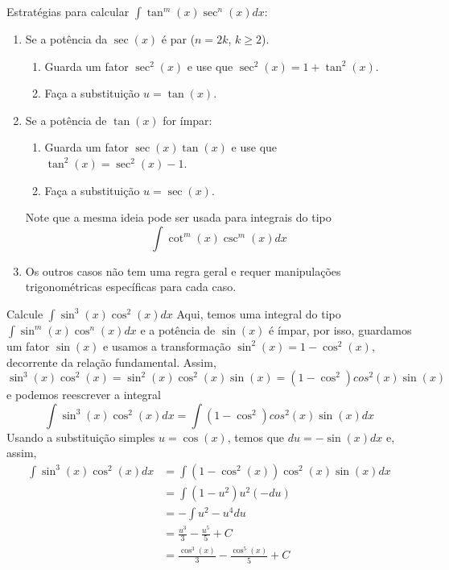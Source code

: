 Estratégias para calcular \(\int \tan^m(x) \sec^n(x)dx\):
\begin{enumerate}
  \item Se a potência da $\sec(x)$ é par ($n=2k$, $k \geq 2$).
        \begin{enumerate}
          \item Guarda um fator $\sec^2(x)$ e use que $\sec^2(x)=1+\tan^2(x)$.
          \item Faça a substituição $u=\tan(x)$.
        \end{enumerate}

  \item Se a potência de $\tan(x)$ for ímpar:
        \begin{enumerate}
          \item Guarda um fator $\sec(x)\tan(x)$ e use que $\tan^2(x)=\sec^2(x)-1$.
          \item Faça a substituição $u=\sec(x)$.
        \end{enumerate}
        Note que a mesma ideia pode ser usada para integrais do tipo
        \[
          \int \cot^m(x) \csc^m(x)dx
        \]

  \item Os outros casos não tem uma regra geral e requer manipulações
        trigonométricas específicas para cada caso.
\end{enumerate}

\begin{example}
  Calcule \(\int \sin^3(x)\cos^2(x)dx\)
  \solution
  Aqui, temos uma integral do tipo
  \(\int \sin^m(x) \cos^n(x)dx\)
  e a potência de $\sin(x)$ é ímpar,
  por isso, guardamos um fator $\sin(x)$ e usamos a transformação
  $\sin^2(x)= 1- \cos^2(x)$,
  decorrente da relação fundamental. Assim,
  \[
    \sin^3(x)\cos^2(x)= \sin^2(x)\cos^2(x)\sin(x)= (1-\cos^2)cos^2(x)\sin(x)
  \]
  e podemos reescrever a integral
  \[
    \int \sin^3(x)\cos^2(x)dx
    = \int \left(1-\cos^2\right)cos^2(x)\sin(x) dx
  \]
  Usando a substituição simples $u= \cos(x)$, temos que $du=-\sin(x)dx$ e, assim,
  \begin{align*}
    \int \sin^3(x)\cos^2(x)dx
    & = \int \left(1-\cos^2(x)\right)\cos^2(x)\sin(x) dx \\
    & = \int (1-u^2)u^2(-du) \\
    & = -\int u^2-u^4 du \\
    & = \frac{u^3}{3} - \frac{u^5}{5} + C \\
    & = \frac{\cos^3(x)}{3}- \frac{\cos^5(x)}{5} + C
  \end{align*}
\end{example}

